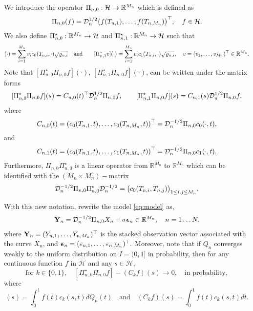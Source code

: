 \documentclass{article}
\begin{document}
We introduce the  operator $\Pi_{n,0}:\mathcal{H} \to \mathbb R^{M_n}$ which is defined as 
$$
\Pi_{n,0} (f)=\mathcal {\mathcal{D}}_n ^{1/2} \big(f(T_{n,1}),\ldots,f(T_{n,M_n})\big)^\top,\quad f\in\mathcal{H}.
$$
We also define $\Pi_{n,0}^\star: \mathbb R^{M_n}\to\mathcal{H}$ and $\Pi_{n,1}^\star: \mathbb R^{M_n}\to\mathcal{H}$ such that 
\begin{align*}
[\Pi_{n,0}^\star v ](\cdot) = \sum_{i=1}^{M_n} v_i c_0(T_{n,i},\cdot)\sqrt{\varrho_{n,i}}
\quad\text{and}\qquad
[\Pi_{n,1}^\star v](\cdot) =  \sum_{i=1}^{M_n} v_i c_1(T_{n,i},\cdot)\sqrt{\varrho_{n,i}} ,\quad v=(v_1,\ldots,v_{M_n})^\top\in\RR^{M_n}.
\end{align*}
Note that $[\Pi_{n,0}^\star \Pi_{n,0} f](\cdot)$, $[\Pi_{n,1}^\star \Pi_{n,0} f ](\cdot) $, can be written under the matrix forms  
\begin{equation}\label{matrix_form1}
	[\Pi_{n,0}^\star \Pi_{n,0} f ](s)= C_{n,0}(t)^\top \mathcal{D}_n^{1/2} \Pi_{n,0}f  ,   \qquad [\Pi_{n,1}^\star \Pi_{n,0} f ](s) = C_{n,1}(s) \mathcal{D}_n^{1/2} \Pi_{n,0}f ,
\end{equation}
where 
$$
C_{n,0}(t)=\left(c_0(T_{n,1},t),\ldots ,c_0(T_{n,M_n},t)\right)^\top=\mathcal{D}_n^{-1/2}\Pi_{n,0} c_0(\cdot,t) ,
$$
and
$$
C_{n,1}(t)=\left(c_0(T_{n,1},t),\ldots ,c_1(T_{n,M_n},t)\right)^\top=\mathcal{D}_n^{-1/2}\Pi_{n,0} c_1(\cdot,t).
$$
Furthermore, $\Pi_{n,0}\Pi_{n,0}^\star$ is a linear operator from $\mathbb R^{M_n}$  to $\mathbb R^{M_n}$  which can be identified with the $(M_n\times M_n)-$matrix 
\begin{equation}\label{matrix_form2}
\mathcal{D}_n^{-1/2}\Pi_{n,0}\Pi_{n,0}^\star \mathcal{D}_n^{-1/2}= \big( c_0(T_{n,i},T_{n,j})\big)_{1\leq i,j\leq M_n}.
\end{equation}



With this new notation,  rewrite the model \eqref{eq:model} as,
$$
\mathbf{Y}_n = \mathcal{D}_n^{-1/2}\Pi_{n,0} X_n + \sigma \boldsymbol{\epsilon}_n \in\mathbb{R}^{M_n},\quad n=1\ldots N,
$$
where $\mathbf{Y}_{n}=(Y_{n,1}, \ldots, Y_{n,M_{n}})^\top$ is the stacked observation vector associated with the curve $X_{n}$, and $\boldsymbol{\epsilon}_n=({\varepsilon}_{n,1}, \ldots, {\varepsilon}_{n,M_{n}})^\top.$
Moreover, note that if $Q_n$ converges weakly to the uniform distribution on $I=(0,1]$ in probability, then for any continuous function $f$ in $\mathcal H$ and any $s\in\mathcal H$,
$$
\text{for } k\in\{0,1\},\quad [\Pi_{n,k}^\star \Pi_{n,0} f ] - (C_kf)(s)  \rightarrow 0,\quad \text{in probability},
$$
where
\begin{equation}
	[\Pi_{n,k}^\star \Pi_{n,0} f ](s)=\int_0^1 f(t)c_k(s,t)dQ_n(t)
	\quad \text{and} \quad  (C_kf)(s)=\int_0^1 f(t) c_k(s,t)dt.
\end{equation}
\end{document}
